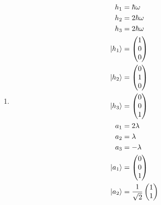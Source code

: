 \documentclass{article}
\begin{document}
\begin{enumerate}
  \item

        \begin{align*}
          h_1       & = \hbar \omega                      \\
          h_2       & = 2 \hbar \omega                    \\
          h_3       & = 2 \hbar \omega                    \\
          \ket{h_1} & = \begin{pmatrix}
                          1 \\
                          0 \\
                          0
                        \end{pmatrix}                    \\
          \ket{h_2} & = \begin{pmatrix}
                          0 \\
                          1 \\
                          0
                        \end{pmatrix}                    \\
          \ket{h_3} & = \begin{pmatrix}
                          0 \\
                          0 \\
                          1
                        \end{pmatrix}                    \\
          a_1       & = 2 \lambda                         \\
          a_2       & = \lambda                           \\
          a_3       & = -\lambda                          \\
          \ket{a_1} & = \begin{pmatrix}
                          0 \\
                          0 \\
                          1
                        \end{pmatrix}                    \\
          \ket{a_2} & = \frac{1}{\sqrt{2}} \begin{pmatrix}
                                             1 \\
                                             1 \\

\end{pmatrix}
\end{align*}
\end{enumerate}
\end{document}

